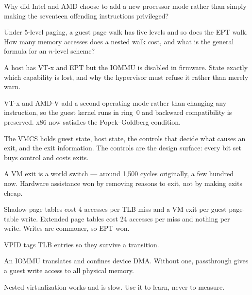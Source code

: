 \begin{checkpoint}
\begin{tightnum}
  \item Why did Intel and AMD choose to add a new processor mode rather than
        simply making the seventeen offending instructions privileged?
  \item Under 5-level paging, a guest page walk has five levels and so does
        the EPT walk. How many memory accesses does a nested walk cost, and
        what is the general formula for an $n$-level scheme?
  \item A host has VT-x and EPT but the IOMMU is disabled in firmware. State
        exactly which capability is lost, and why the hypervisor must refuse
        it rather than merely warn.
\end{tightnum}
\end{checkpoint}

\begin{chaptersummary}
\begin{tight}
  \item VT-x and AMD-V add a second operating mode rather than changing any
        instruction, so the guest kernel runs in ring~0 and backward
        compatibility is preserved. x86 now satisfies the Popek--Goldberg
        condition.
  \item The VMCS holds guest state, host state, the controls that decide what
        causes an exit, and the exit information. The controls are the design
        surface: every bit set buys control and costs exits.
  \item A VM exit is a world switch --- around 1{,}500 cycles originally, a few
        hundred now. Hardware assistance won by removing reasons to exit, not
        by making exits cheap.
  \item Shadow page tables cost 4 accesses per TLB miss and a VM exit per guest
        page-table write. Extended page tables cost 24 accesses per miss and
        nothing per write. Writes are commoner, so EPT won.
  \item VPID tags TLB entries so they survive a transition.
  \item An IOMMU translates and confines device DMA. Without one, passthrough
        gives a guest write access to all physical memory.
  \item Nested virtualization works and is slow. Use it to learn, never to
        measure.
\end{tight}
\end{chaptersummary}

